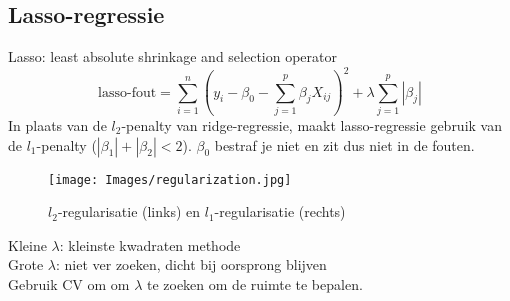 {\subsection{Lasso-regressie}
Lasso: least absolute shrinkage and selection operator
\[\textrm{lasso-fout}=\sum\limits_{i=1}^n(y_i-\beta_0-\sum\limits_{j=1}^p\beta_jX_{ij})^2+\lambda\sum\limits_{j=1}^p|\beta_j|\]
In plaats van de $l_2$-penalty van ridge-regressie, maakt lasso-regressie gebruik van de $l_1$-penalty ($|\beta_1|+|\beta_2|<2$). $\beta_0$ bestraf je niet en zit dus niet in de fouten.

\begin{figure}[h]
    \centering
    \texttt{[image: Images/regularization.jpg]}
    \caption{$l_2$-regularisatie (links) en $l_1$-regularisatie (rechts)}
    \label{fig:regularisatie}
\end{figure}

\noindent Kleine $\lambda$: kleinste kwadraten methode\\
Grote $\lambda$: niet ver zoeken, dicht bij oorsprong blijven\\
Gebruik CV om om $\lambda$ te zoeken om de ruimte te bepalen.
}
